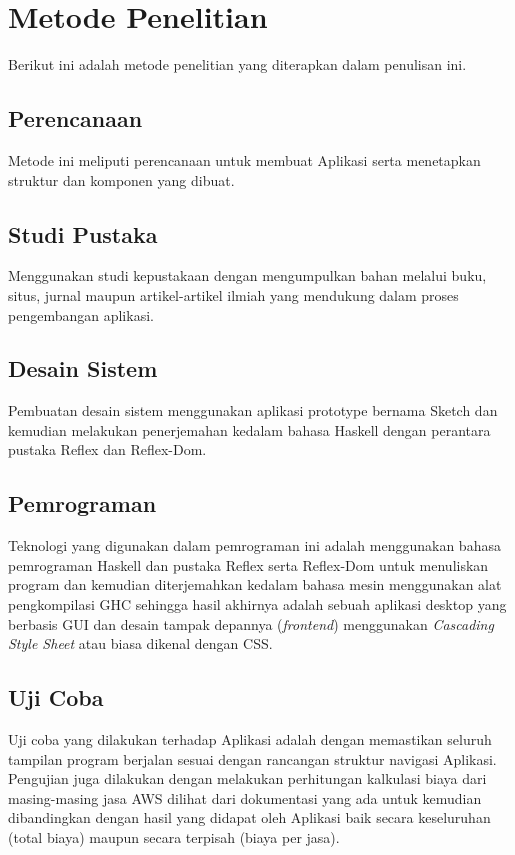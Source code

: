 \documentclass[pi.tex]{subfile}
\begin{document}
\section{Metode Penelitian}
Berikut ini adalah metode penelitian yang diterapkan dalam penulisan ini.

\subsection{Perencanaan}\hspace{6pt}
Metode ini meliputi perencanaan untuk membuat Aplikasi serta menetapkan struktur dan komponen yang dibuat.
\subsection{Studi Pustaka}\hspace{6pt}
Menggunakan studi kepustakaan dengan mengumpulkan bahan melalui buku, situs, jurnal maupun artikel-artikel ilmiah yang mendukung dalam proses pengembangan aplikasi.
\subsection{Desain Sistem}\hspace{6pt}
Pembuatan desain sistem menggunakan aplikasi prototype bernama Sketch dan kemudian melakukan penerjemahan kedalam bahasa Haskell dengan perantara pustaka Reflex dan Reflex-Dom.
\subsection{Pemrograman}\hspace{6pt}
Teknologi yang digunakan dalam pemrograman ini adalah menggunakan bahasa pemrograman Haskell dan pustaka Reflex serta Reflex-Dom untuk menuliskan program dan kemudian diterjemahkan kedalam bahasa mesin menggunakan alat pengkompilasi GHC sehingga hasil akhirnya adalah sebuah aplikasi desktop yang berbasis GUI dan desain tampak depannya (\emph{frontend}) menggunakan \emph{Cascading Style Sheet} atau biasa dikenal dengan CSS.
\subsection{Uji Coba}\hspace{6pt}
Uji coba yang dilakukan terhadap Aplikasi adalah dengan memastikan seluruh tampilan program berjalan sesuai dengan rancangan struktur navigasi Aplikasi. Pengujian juga dilakukan dengan melakukan perhitungan kalkulasi biaya dari masing-masing jasa AWS dilihat dari dokumentasi yang ada untuk kemudian dibandingkan dengan hasil yang didapat oleh Aplikasi baik secara keseluruhan (total biaya) maupun secara terpisah (biaya per jasa).
\end{document}
